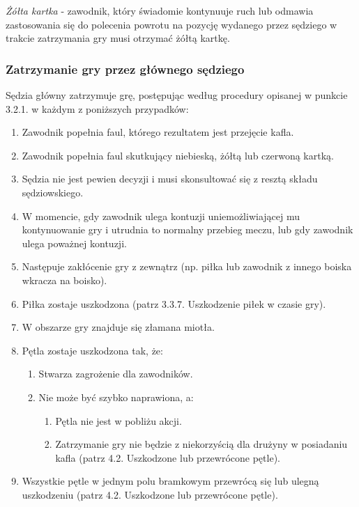 \documentclass[12pt]{article}
\begin{document}
\emph{Żółta kartka} - zawodnik, który świadomie kontynuuje ruch lub
odmawia zastosowania się do polecenia powrotu na pozycję wydanego przez
sędziego w trakcie zatrzymania gry musi otrzymać żółtą kartkę.

\subsubsection{Zatrzymanie gry przez głównego sędziego}

Sędzia główny zatrzymuje grę, postępując według procedury opisanej w
punkcie 3.2.1. w każdym z poniższych przypadków:

\begin{enumerate}
	\item Zawodnik popełnia faul, którego rezultatem jest przejęcie kafla.

	\item Zawodnik popełnia faul skutkujący niebieską, żółtą lub czerwoną
	      kartką.

	\item Sędzia nie jest pewien decyzji i musi skonsultować się z resztą
	      składu sędziowskiego.

	\item W momencie, gdy zawodnik ulega kontuzji uniemożliwiającej mu
	      kontynuowanie gry i utrudnia to normalny przebieg meczu, lub gdy
	      zawodnik ulega poważnej kontuzji.

	\item Następuje zakłócenie gry z zewnątrz (np. piłka lub zawodnik z innego
	      boiska wkracza na boisko).

	\item Piłka zostaje uszkodzona (patrz 3.3.7. Uszkodzenie piłek w czasie
	      gry).

	\item W obszarze gry znajduje się złamana miotła.

	\item Pętla zostaje uszkodzona tak, że:
	      \begin{enumerate}
		      \item Stwarza zagrożenie dla zawodników.

		      \item Nie może być szybko naprawiona, a:

		            \begin{enumerate}
			            \item
			                  Pętla nie jest w pobliżu akcji.
			            \item
			                  Zatrzymanie gry nie będzie z niekorzyścią dla drużyny w posiadaniu
			                  kafla (patrz 4.2. Uszkodzone lub przewrócone pętle).
		            \end{enumerate}
	      \end{enumerate}
	\item Wszystkie pętle w jednym polu bramkowym przewrócą się lub ulegną
	      uszkodzeniu (patrz 4.2. Uszkodzone lub przewrócone pętle).


\end{enumerate}
\end{document}
